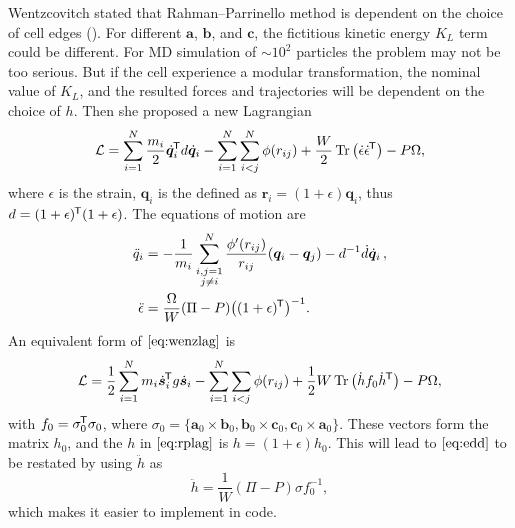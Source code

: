 Wentzcovitch stated that Rahman--Parrinello method is dependent on
the choice of cell edges (\cite{Wentzcovitch:1991ka}).
For different $\bm{a}$, $\bm{b}$, and
$\bm{c}$, the fictitious kinetic energy $K_L$ term could be different.
For MD simulation of $\sim 10^2$ particles the problem may
not be too serious. But if the cell experience a modular transformation,
the nominal value of $K_L$, and the resulted forces and trajectories
will be dependent on the choice of $h$. Then she proposed a new
Lagrangian
\begin{equation}\label{eq:wenzlag}
	\mathcal{L} = \sum_{i=1}^{N} \frac{ m_i }{ 2 }\dot{ \bm{q} }_i^{\mkern-1.5mu\mathsf{T}} d \dot{ \bm{q} }_i
	- \sum_{i=1}^{N} \sum_{i<j}^{N} \phi(r_{ij}) + \frac{ W }{ 2 }
	\Tr \big( \dot{ \epsilon } \dot{ \epsilon }^{\mkern-1.5mu\mathsf{T}} \big) - P \Omega,
\end{equation}
where $\epsilon$ is the strain, $\bm{q}_i$ is the defined as
$\bm{r}_i = (1+\epsilon) \bm{q}_i$, thus $d = (1 + \epsilon)^{\mkern-1.5mu\mathsf{T}}
	(1+\epsilon)$.
The equations of motion are
\begin{subequations}
	\begin{align}
		\ddot{q}_i      & = - \frac{ 1 }{ m_i } \sum_{\substack{i, j=1 \\j\neq i}}^{N}
		\frac{ \phi'(r_{ij}) }{ r_{ij} }(\bm{q}_i - \bm{q}_j) - d^{-1} \dot{ d }
		\dot{ \bm{q} }_i \thinspace,                                   \\
		\ddot{\epsilon} & = \frac{ \Omega }{ W } (\Pi - P)
		\big((1+\epsilon)^{\mkern-1.5mu\mathsf{T}}\big)^{-1}.\label{eq:edd}
	\end{align}
\end{subequations}
An equivalent form of $\eqref{eq:wenzlag}$ is
\begin{equation}
	\mathcal{L} = \frac{ 1 }{ 2 } \sum_{i=1}^{N} m_i \dot{ \bm{s} }_i ^{\mkern-1.5mu\mathsf{T}}
	g \dot{ \bm{s} }_i - \sum_{i=1}^{N} \sum_{i<j} \phi (r_{ij}) +
	\frac{ 1 }{ 2 } W \Tr \big(\dot{h} f_0 \dot{h}^{\mkern-1.5mu\mathsf{T}} \big) - P \Omega,
\end{equation}
with $f_0 = \sigma_0 ^{\mkern-1.5mu\mathsf{T}} \sigma_0$, where $\sigma_0 = \{
	\bm{a}_0 \times \bm{b}_0, \bm{b}_0 \times \bm{c}_0,
	\bm{c}_0 \times \bm{a}_0 \}$. These vectors form the matrix $h_0$,
and the $h$ in $\eqref{eq:rplag}$ is $h = (1+\epsilon) h_0$.
This will lead to $\eqref{eq:edd}$ to be restated by using $\ddot{h}$
as
\begin{equation}\label{eq:wenzhdd}
	\ddot{h} = \frac{ 1 }{ W } (\Pi - P) \sigma f_0^{-1},
\end{equation}
which makes it easier to implement in code.


